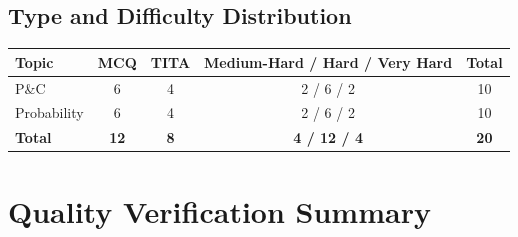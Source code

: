 \documentclass[11pt]{article}
\begin{document}
\subsection*{Type and Difficulty Distribution}

\begin{tabular}{|l|c|c|c|c|}
\hline
\textbf{Topic} & \textbf{MCQ} & \textbf{TITA} & \textbf{Medium-Hard / Hard / Very Hard} & \textbf{Total} \\
\hline
P\&C & 6 & 4 & 2 / 6 / 2 & 10 \\
\hline
Probability & 6 & 4 & 2 / 6 / 2 & 10 \\
\hline
\textbf{Total} & \textbf{12} & \textbf{8} & \textbf{4 / 12 / 4} & \textbf{20} \\
\hline
\end{tabular}

\newpage

\section*{Quality Verification Summary}
\end{document}
